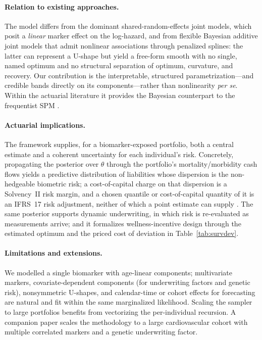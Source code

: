 \documentclass[review,3p,times]{elsarticle}
\begin{document}
\paragraph{Relation to existing approaches.} The model differs from the dominant
shared-random-effects joint models, which posit a \emph{linear} marker effect on
the log-hazard, and from flexible Bayesian additive joint models that admit
nonlinear associations through penalized splines: the latter can represent a
U-shape but yield a free-form smooth with no single, named optimum and no
structural separation of optimum, curvature, and recovery. Our contribution is the
interpretable, structured parametrization---and credible bands directly on its
components---rather than nonlinearity \emph{per se}. Within the actuarial
literature it provides the Bayesian counterpart to the frequentist SPM
\citep{Yashin2012NAAJ,Yashin2016NAAJ}.

\paragraph{Actuarial implications.} The framework supplies, for a biomarker-exposed
portfolio, both a central estimate and a coherent uncertainty for each individual's
risk. Concretely, propagating the posterior over $\theta$ through the portfolio's
mortality/morbidity cash flows yields a predictive distribution of liabilities
whose dispersion is the non-hedgeable biometric risk; a cost-of-capital charge on
that dispersion is a Solvency~II risk margin, and a chosen quantile or
cost-of-capital quantity of it is an IFRS~17 risk adjustment, neither of which a
point estimate can supply \citep{EnglandVerrallWuthrich2019}. The same posterior
supports dynamic underwriting,
in which risk is re-evaluated as measurements arrive; and it formalizes
wellness-incentive design through the estimated optimum and the priced cost of
deviation in Table~\ref{tab:survdev}.

\paragraph{Limitations and extensions.} We modelled a single biomarker with
age-linear components; multivariate markers, covariate-dependent components (for
underwriting factors and genetic risk), nonsymmetric U-shapes, and calendar-time or
cohort effects for forecasting are natural and fit within the same marginalized
likelihood. Scaling the sampler to large portfolios benefits from vectorizing the
per-individual recursion. A companion paper scales the methodology to a large cardiovascular cohort with
multiple correlated markers and a genetic underwriting factor.
\end{document}

